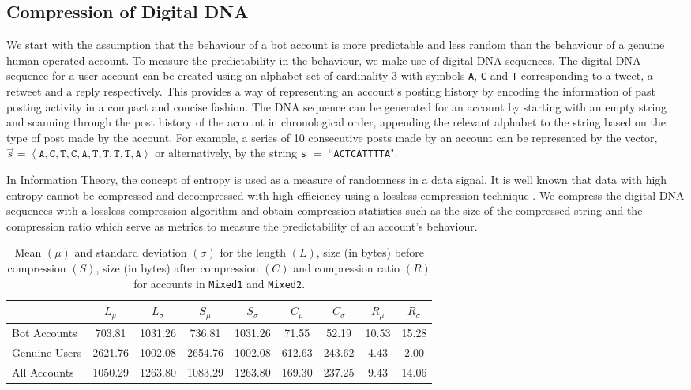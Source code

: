 \documentclass{llncs}
\begin{document}
\subsection{Compression of Digital DNA}
We start with the assumption that the behaviour of a bot account is more predictable and less random than the behaviour of a genuine human-operated account. To measure the predictability in the behaviour, we make use of digital DNA sequences.
The digital DNA sequence for a user account can be created using an alphabet set of cardinality 3 with symbols \texttt{A}, \texttt{C} and \texttt{T} corresponding to a tweet, a retweet and a reply respectively. This provides a way of representing an account's posting history by encoding the information of past posting activity in a compact and concise fashion. The DNA sequence can be generated for an account by starting with an empty string and scanning through the post history of the account in chronological order, appending the relevant alphabet to the string based on the type of post made by the account. For example, a series of 10 consecutive posts made by an account can be represented by the vector, $\vec s = \left< \texttt{A}, \texttt{C}, \texttt{T}, \texttt{C}, \texttt{A}, \texttt{T}, \texttt{T}, \texttt{T}, \texttt{T}, \texttt{A} \right>$ or alternatively, by the string \texttt{s} $=$ ``\texttt{ACTCATTTTA}". 

In Information Theory, the concept of entropy is used as a measure of randomness in a data signal. It is well known that data with high entropy cannot be compressed and decompressed with high efficiency using a lossless compression technique \cite{mackay2003information}. We compress the digital DNA sequences with a lossless compression algorithm and obtain compression statistics such as the size of the compressed string and the compression ratio which serve as metrics to measure the predictability of an account's behaviour.

\begin{table}
\caption{\label{tab:compression_stats} Mean $(\mu)$ and standard deviation $(\sigma)$ for the length $(L)$, size (in bytes) before compression $(S)$, size (in bytes) after compression $(C)$ and compression ratio $(R)$ for accounts in \texttt{Mixed1} and \texttt{Mixed2}.}
\begin{tabularx}{\textwidth}{X c c c c c c c c}
\hline
 & $L_\mu$ & $L_\sigma$ & $S_\mu$ & $S_\sigma$ & $C_\mu$ & $C_\sigma$ & $R_\mu$ & $R_\sigma$ \\
\hline
Bot Accounts & 703.81 &  1031.26 &  736.81 &  1031.26 &  71.55 &  52.19 &  10.53 &  15.28 \\ 
Genuine Users & 2621.76 &  1002.08 &  2654.76 &  1002.08 &  612.63 &  243.62 &  4.43 &  2.00 \\
\hline
All Accounts & 1050.29 &  1263.80 &  1083.29 &  1263.80 &  169.30 &  237.25 &  9.43 &  14.06 \\
\hline
\end{tabularx}
\end{table}
\end{document}
